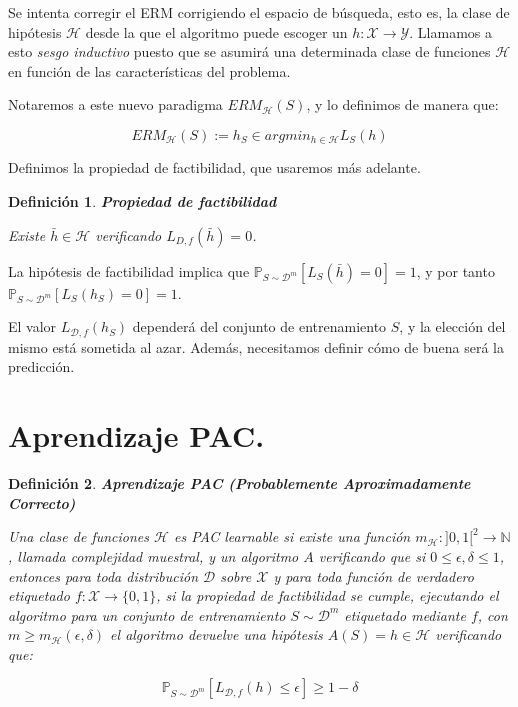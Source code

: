 \documentclass[11pt]{article}
\newtheorem{definition}{Definición}
\begin{document}
\begin{enumerate}
Se intenta corregir el ERM corrigiendo el espacio de búsqueda, esto es, la clase de hipótesis $\mathcal{H}$ desde la que el algoritmo puede escoger un $h: \mathcal{X}\rightarrow \mathcal{Y}$. Llamamos a esto \emph{sesgo inductivo} puesto que se asumirá una determinada clase de funciones $\mathcal{H}$ en función de las características del problema.

Notaremos a este nuevo paradigma $ERM_{\mathcal{H}}(S)$, y lo definimos de manera que:

\[ERM_{\mathcal{H}}(S) := h_S \in argmin_{h\in \mathcal{H}} L_S(h)\]

Definimos la propiedad de factibilidad, que usaremos más adelante.

\begin{definition}
\textbf{Propiedad de factibilidad}

Existe  $\bar{h} \in \mathcal{H}$ verificando $L_{D,f}(\bar{h}) = 0$.
\end{definition}

La hipótesis de factibilidad implica que $\mathbb{P}_{S\sim \mathcal{D}^m}[L_S(\bar{h})=0] = 1$, y por tanto $\mathbb{P}_{S\sim \mathcal{D}^m}[L_S(h_S)=0]=1$.

El valor $L_{\mathcal{D},f}(h_S)$ dependerá del conjunto de entrenamiento $S$, y la elección del mismo está sometida al azar. Además, necesitamos definir cómo de buena será la predicción.
\end{enumerate}

\section{Aprendizaje PAC.}
\label{sec-2}

\begin{definition}
\textbf{Aprendizaje PAC (Probablemente Aproximadamente Correcto)}

Una clase de funciones $\mathcal{H}$ es PAC learnable si existe una función $m_{\mathcal{H}} : ]0,1[^2\rightarrow \mathbb{N}$, llamada complejidad muestral, y un algoritmo $A$ verificando que si $0 \le \epsilon, \delta \le 1$, entonces para toda distribución $\mathcal{D}$ sobre $\mathcal{X}$ y para toda función de verdadero etiquetado $f:\mathcal{X} \rightarrow \{0,1\}$, si la propiedad de factibilidad se cumple, ejecutando el algoritmo para un conjunto de entrenamiento $S\sim \mathcal{D}^m$ etiquetado mediante $f$, con $m\ge m_{\mathcal{H}}(\epsilon, \delta)$ el algoritmo devuelve una hipótesis $A(S) = h\in \mathcal{H}$ verificando que:

\[\mathbb{P}_{S\sim \mathcal{D}^m}[L_{\mathcal{D},f}(h) \le \epsilon] \ge 1-\delta\]
\end{definition}
\end{document}
